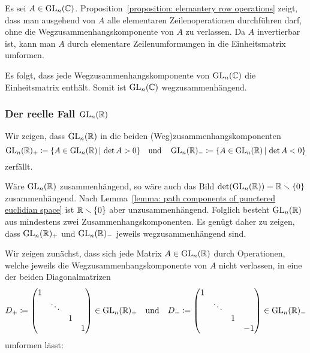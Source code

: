 Es sei $A \in \operatorname{GL}_{n}(\mathbb{C})$.
Proposition~\ref{proposition: elemantery row operations} zeigt, dass man ausgehend von $A$ alle elementaren Zeilenoperationen durchführen darf, ohne die Wegzusammenhangskomponente von $A$ zu verlassen.
Da $A$ invertierbar ist, kann man $A$ durch elementare Zeilenumformungen in die Einheitsmatrix umformen.

Es folgt, dass jede Wegzusammenhangskomponente von $\operatorname{GL}_{n}(\mathbb{C})$ die Einheitsmatrix enthält.
Somit ist $\operatorname{GL}_{n}(\mathbb{C})$ wegzusammenhängend.





\subsubsection{Der reelle Fall \texorpdfstring{$\operatorname{GL}_{n}(\mathbb{R})$}{GLnR}}

Wir zeigen, dass $\operatorname{GL}_{n}(\mathbb{R})$ in die beiden (Weg)zusammenhangskomponenten
\[
            \operatorname{GL}_{n}(\mathbb{R})_+
  \coloneqq \{A \in \operatorname{GL}_{n}(\mathbb{R}) \,|\, \det A > 0\}
  \quad\text{und}\quad
            \operatorname{GL}_{n}(\mathbb{R})_-
  \coloneqq \{A \in \operatorname{GL}_{n}(\mathbb{R}) \,|\, \det A < 0\}
\]
zerfällt.

Wäre $\operatorname{GL}_{n}(\mathbb{R})$ zusammenhängend, so wäre auch das Bild $\det( \operatorname{GL}_{n}(\mathbb{R}) ) = \mathbb{R} \smallsetminus \{0\}$ zusammenhängend.
Nach Lemma~\ref{lemma: path components of punctered euclidian space} ist $\mathbb{R} \smallsetminus \{0\}$ aber unzusammenhängend.
Folglich besteht $\operatorname{GL}_{n}(\mathbb{R})$ aus mindestens zwei Zusammenhangskomponenten.
Es genügt daher zu zeigen, dass $\operatorname{GL}_{n}(\mathbb{R})_+$ und $\operatorname{GL}_{n}(\mathbb{R})_-$ jeweils wegzusammenhängend sind.

Wir zeigen zunächst, dass sich jede Matrix $A \in \operatorname{GL}_{n}(\mathbb{R})$ durch Operationen, welche jeweils die Wegzusammenhangskomponente von $A$ nicht verlassen, in eine der beiden Diagonalmatrizen
\[
            D_+
  \coloneqq \begin{pmatrix}
              1 &         &   &   \\
                & \ddots  &   &   \\
                &         & 1 &   \\
                &         &   & 1
            \end{pmatrix}
            \in \operatorname{GL}_{n}(\mathbb{R})_+
  \quad\text{und}\quad
            D_-
  \coloneqq \begin{pmatrix}
              1 &         &   &     \\
                & \ddots  &   &     \\
                &         & 1 &     \\
                &         &   & -1
            \end{pmatrix}
            \in \operatorname{GL}_{n}(\mathbb{R})_-
\]
umformen lässt:

